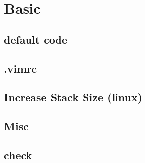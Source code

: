 \documentclass[a4paper,10pt,twocolumn,oneside]{article}
\begin{document}
\pagestyle{fancy}
\fancyfoot{}
\fancyhead[R]{\thepage}
\renewcommand{\headrulewidth}{0.4pt}
\renewcommand{\contentsname}{Contents} 

\scriptsize
\tableofcontents


\section{Basic}

\subsection{default code}


\subsection{.vimrc}


\subsection{Increase Stack Size (linux)}


% 

\subsection{Misc}


\subsection{check}


% 

% 
\end{document}
